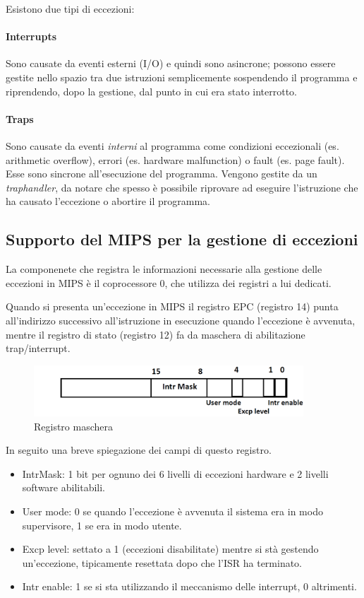 \documentclass[class=book, crop=false, oneside]{standalone}
\begin{document}
Esistono due tipi di eccezioni:
\paragraph{Interrupts} Sono causate da eventi esterni (I/O) e quindi sono asincrone; possono essere gestite nello spazio tra due istruzioni semplicemente sospendendo il programma e riprendendo, dopo la gestione, dal punto in cui era stato interrotto.
\paragraph{Traps} Sono causate da eventi \emph{interni} al programma come condizioni eccezionali (es. arithmetic overflow), errori (es. hardware malfunction) o fault (es. page fault).
Esse sono sincrone all’esecuzione del programma.
Vengono gestite da un \emph{traphandler}, da notare che spesso è possibile riprovare ad eseguire l’istruzione che ha causato l’eccezione o abortire il programma.

\subsection{Supporto del MIPS per la gestione di eccezioni}
La componenete che registra le informazioni necessarie alla gestione delle eccezioni in MIPS è il coprocessore 0, che utilizza dei registri a lui dedicati.

Quando si presenta un'eccezione in MIPS il registro EPC (registro 14) punta all’indirizzo successivo all’istruzione in esecuzione quando l’eccezione è avvenuta, mentre il registro di stato (registro 12) fa da maschera di abilitazione trap/interrupt.

\begin{figure}[H]
	\centering
	\includegraphics[width=0.9\textwidth,keepaspectratio]{registro-maschera}
	\caption{Registro maschera}
\end{figure}

In seguito una breve spiegazione dei campi di questo registro.
\begin{itemize}
	\item IntrMask:  1 bit per ognuno dei 6 livelli di eccezioni hardware e 2 livelli software abilitabili.
	\item User mode: 0 se quando l’eccezione è avvenuta il sistema era in modo supervisore, 1 se era in modo utente.
	\item Excp level: settato a 1 (eccezioni disabilitate) mentre si stà gestendo un’eccezione, tipicamente resettata dopo che l’ISR ha terminato.
	\item Intr enable: 1 se si sta utilizzando il meccanismo delle interrupt, 0 altrimenti.
\end{itemize}
\end{document}
